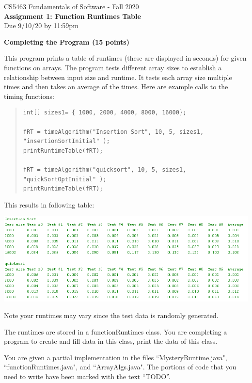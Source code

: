 \documentclass[12pt]{elsart}
\begin{document}
\pagestyle{empty}

\begin{center}
\Large  CS5463 Fundamentals of Software  - Fall 2020 \\
\large {\bf Assignment 1: Function Runtimes Table}\\
\normalsize Due 9/10/20 by 11:59pm
\end{center}

{\bf Completing the Program (15 points)}

This program prints a table of runtimes (these are displayed in seconds) for given functions on arrays.  The program tests different array sizes to establish a relationship between input size and runtime.  It tests each array size multiple times and then takes an average of the times.  Here are example calls to the timing functions:

\begin{quote}
\small
\begin{verbatim}
int[] sizes1= { 1000, 2000, 4000, 8000, 16000};

fRT = timeAlgorithm("Insertion Sort", 10, 5, sizes1, "insertionSortInitial" );
printRuntimeTable(fRT);

fRT = timeAlgorithm("quicksort", 10, 5, sizes1, "quickSortOptInitial" );
printRuntimeTable(fRT);
\end{verbatim}
\end{quote}


This results in following table:

\includegraphics[width=16cm]{ExampleTable}

Note your runtimes may vary since the test data is randomly generated.

The runtimes are stored in a functionRuntimes class.  You are completing a program to create and fill data in this class, print the data of this class.  

You are given a partial implementation in the files ``MysteryRuntime.java", ``functionRuntimes.java", and ``ArrayAlgs.java".  The portions of code that you need to write have been marked with the text ``TODO''.
\end{document}
